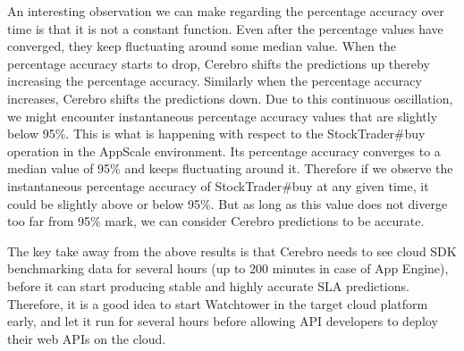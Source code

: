 An interesting observation we can make regarding the percentage accuracy over time is that it is not a constant function. 
Even after the percentage values have converged, they keep fluctuating 
around some median value. When the percentage accuracy starts to drop, Cerebro shifts the predictions up thereby increasing
the percentage accuracy. Similarly when the percentage accuracy increases, Cerebro shifts the predictions down. Due to this
continuous oscillation, we might encounter instantaneous percentage accuracy values that are slightly 
below 95\%. This is what is
happening with respect to the StockTrader\#buy operation in the AppScale environment. Its percentage accuracy converges to a median
value of 95\% and keeps fluctuating around it. Therefore if we observe the instantaneous percentage accuracy of 
StockTrader\#buy at any given time, it
could be slightly above or below 95\%. 
But as long as this value does not diverge too far from 95\% mark, we can consider Cerebro predictions to
be accurate.

The key take away from the above results is that Cerebro needs to see cloud SDK benchmarking data 
for several hours (up to 200 minutes in case of 
App Engine), before it can start producing stable and highly accurate SLA predictions. Therefore, it is a good idea to start Watchtower in the
target cloud platform early, and let it run for several hours before allowing API developers to deploy their web APIs on the cloud. 
